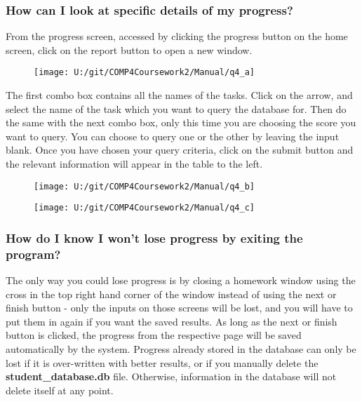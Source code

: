 \subsubsection{How can I look at specific details of my progress?}

From the progress screen, accessed by clicking the progress button on the home screen, click on the report button to open a new window.

\begin{figure}[H]
    \texttt{[image: U:/git/COMP4Coursework2/Manual/q4\_a]}
\end{figure}

The first combo box contains all the names of the tasks. Click on the arrow, and select the name of the task which you want to query the database for. Then do the same with the next combo box, only this time you are choosing the score you want to query. You can choose to query one or the other by leaving the input blank. Once you have chosen your query criteria, click on the submit button and the relevant information will appear in the table to the left.

\begin{figure}[H]
    \texttt{[image: U:/git/COMP4Coursework2/Manual/q4\_b]}
\end{figure}

\begin{figure}[H]
    \texttt{[image: U:/git/COMP4Coursework2/Manual/q4\_c]}
\end{figure}

\subsubsection{How do I know I won't lose progress by exiting the program?}

The only way you could lose progress is by closing a homework window using the cross in the top right hand corner of the window instead of using the next or finish button - only the inputs on those screens will be lost, and you will have to put them in again if you want the saved results. As long as the next or finish button is clicked, the progress from the respective page will be saved automatically by the system. Progress already stored in the database can only be lost if it is over-written with better results, or if you manually delete the \textbf{student\_database.db} file. Otherwise, information in the database will not delete itself at any point.

